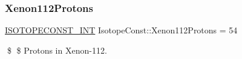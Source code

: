 \subsubsection{\texorpdfstring{Xenon112\+Protons}{Xenon112Protons}}
{\footnotesize\ttfamily \mbox{\hyperlink{group___isotope_const-_macros_ga5f18360b3e99483a35c32d789e62621c}{I\+S\+O\+T\+O\+P\+E\+C\+O\+N\+S\+T\+\_\+\+I\+NT}} Isotope\+Const\+::\+Xenon112\+Protons = 54}

\$ \$ Protons in Xenon-\/112. 